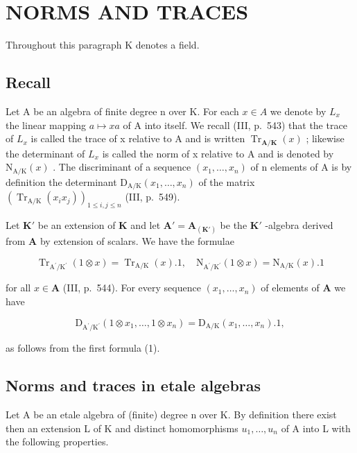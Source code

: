 \section{NORMS AND TRACES}

Throughout this paragraph K denotes a field.

\subsection{Recall}

Let A be an algebra of finite degree n over K. For each \(x \in A\) we denote by \(L_{x}\) the linear mapping \(a \mapsto xa\) of A into itself. We recall (III, p.~543) that the trace of \(L_{x}\) is called the trace of x relative to A and is written \(\operatorname{Tr}_{\mathbf{A}/\mathbf{K}}(x)\) ; likewise the determinant of \(L_{x}\) is called the norm of x relative to A and is denoted by \(\mathrm{N}_{\mathrm{A}/\mathrm{K}}(x)\) . The discriminant of a sequence \((x_{1}, \ldots, x_{n})\) of n elements of A is by definition the determinant \(\mathrm{D}_{\mathrm{A}/\mathrm{K}}(x_{1}, \ldots, x_{n})\) of the matrix \((\operatorname{Tr}_{\mathrm{A}/\mathrm{K}}(x_{i}x_{j}))_{1 \leq i,j \leq n}\) (III, p.~549).

Let \(\mathbf{K}'\) be an extension of \(\mathbf{K}\) and let \(\mathbf{A}' = \mathbf{A}_{(\mathbf{K}')}\) be the \(\mathbf{K}'\) -algebra derived from \(\mathbf{A}\) by extension of scalars. We have the formulae

\[
\operatorname{Tr} _ {\mathrm{A} ^ {\prime} / \mathrm{K} ^ {\prime}} (1 \otimes x) = \operatorname{Tr} _ {\mathrm{A} / \mathrm{K}} (x). 1, \quad \mathrm{N} _ {\mathrm{A} ^ {\prime} / \mathrm{K} ^ {\prime}} (1 \otimes x) = \mathrm{N} _ {\mathrm{A} / \mathrm{K}} (x). 1\tag{1}
\]

for all \(x \in \mathbf{A}\) (III, p.~544). For every sequence \((x_1, \ldots, x_n)\) of elements of \(\mathbf{A}\) we have

\[
\mathrm{D} _ {\mathrm{A} ^ {\prime} / \mathrm{K} ^ {\prime}} (1 \otimes x _ {1}, \dots , 1 \otimes x _ {n}) = \mathrm{D} _ {\mathrm{A} / \mathrm{K}} (x _ {1}, \dots , x _ {n}). 1,\tag{2}
\]

as follows from the first formula (1).

\subsection{Norms and traces in etale algebras}

Let A be an etale algebra of (finite) degree n over K. By definition there exist then an extension L of K and distinct homomorphisms \(u_{1}, \ldots, u_{n}\) of A into L with the following properties.

